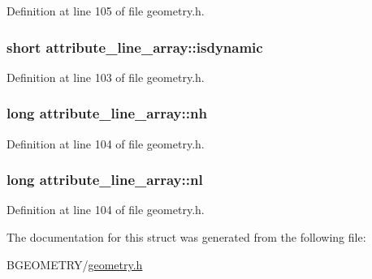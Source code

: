 Definition at line 105 of file geometry.\-h.

\hypertarget{structattribute__line__array_a389f0a5f9f8ffbb1b6079faadf0e062f}{
\subsubsection[{isdynamic}]{\setlength{\rightskip}{0pt plus 5cm}short attribute\-\_\-line\-\_\-array\-::isdynamic}}\label{structattribute__line__array_a389f0a5f9f8ffbb1b6079faadf0e062f}


Definition at line 103 of file geometry.\-h.

\hypertarget{structattribute__line__array_ae263914bf906dafb857886a22e8db713}{
\subsubsection[{nh}]{\setlength{\rightskip}{0pt plus 5cm}long attribute\-\_\-line\-\_\-array\-::nh}}\label{structattribute__line__array_ae263914bf906dafb857886a22e8db713}


Definition at line 104 of file geometry.\-h.

\hypertarget{structattribute__line__array_acf5ef21f87424c806de30fce6bb09544}{
\subsubsection[{nl}]{\setlength{\rightskip}{0pt plus 5cm}long attribute\-\_\-line\-\_\-array\-::nl}}\label{structattribute__line__array_acf5ef21f87424c806de30fce6bb09544}


Definition at line 104 of file geometry.\-h.



The documentation for this struct was generated from the following file\-:\begin{DoxyCompactItemize}
\item 
B\-G\-E\-O\-M\-E\-T\-R\-Y/\hyperlink{geometry_8h}{geometry.\-h}\end{DoxyCompactItemize}
